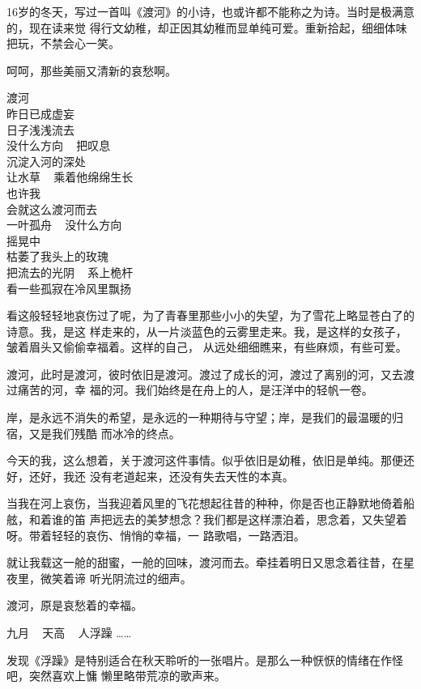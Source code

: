 \documentclass[12pt,a4paper]{article}
\begin{document}
		16岁的冬天，写过一首叫《渡河》的小诗，也或许都不能称之为诗。当时是极满意的，现在读来觉
	得行文幼稚，却正因其幼稚而显单纯可爱。重新拾起，细细体味把玩，不禁会心一笑。

		呵呵，那些美丽又清新的哀愁啊。

		\longpoem{}{}{}
		渡河 \\
		昨日已成虚妄 \\
		日子浅浅流去 \\
		没什么方向 ~ 把叹息 \\
		沉淀入河的深处 \\
		让水草 ~ 乘着他绵绵生长 \\
		也许我 \\
		会就这么渡河而去 \\
		一叶孤舟 ~ 没什么方向 \\
		摇晃中 \\
		枯萎了我头上的玫瑰 \\
		把流去的光阴 ~ 系上桅杆 \\
		看一些孤寂在冷风里飘扬
		\endlongpoem

		看这般轻轻地哀伤过了呢，为了青春里那些小小的失望，为了雪花上略显苍白了的诗意。我，是这
	样走来的，从一片淡蓝色的云雾里走来。我，是这样的女孩子，皱着眉头又偷偷幸福着。这样的自己，
	从远处细细瞧来，有些麻烦，有些可爱。

		渡河，此时是渡河，彼时依旧是渡河。渡过了成长的河，渡过了离别的河，又去渡过痛苦的河，幸
	福的河。我们始终是在舟上的人，是汪洋中的轻帆一卷。

		岸，是永远不消失的希望，是永远的一种期待与守望；岸，是我们的最温暖的归宿，又是我们残酷
	而冰冷的终点。

		今天的我，这么想着，关于渡河这件事情。似乎依旧是幼稚，依旧是单纯。那便还好，还好，我还
	没有老道起来，还没有失去天性的本真。

		当我在河上哀伤，当我迎着风里的飞花想起往昔的种种，你是否也正静默地倚着船舷，和着谁的笛
	声把远去的美梦想念？我们都是这样漂泊着，思念着，又失望着呀。带着轻轻的哀伤、悄悄的幸福，一
	路歌唱，一路洒泪。

		就让我载这一舱的甜蜜，一舱的回味，渡河而去。牵挂着明日又思念着往昔，在星夜里，微笑着谛
	听光阴流过的细声。

		渡河，原是哀愁着的幸福。

	\endwriting



		\longpoem{}{}{}
			九月 ~ 天高 ~ 人浮躁 ……
		\endlongpoem

		发现《浮躁》是特别适合在秋天聆听的一张唱片。是那么一种恹恹的情绪在作怪吧，突然喜欢上慵
	懒里略带荒凉的歌声来。
\end{document}
